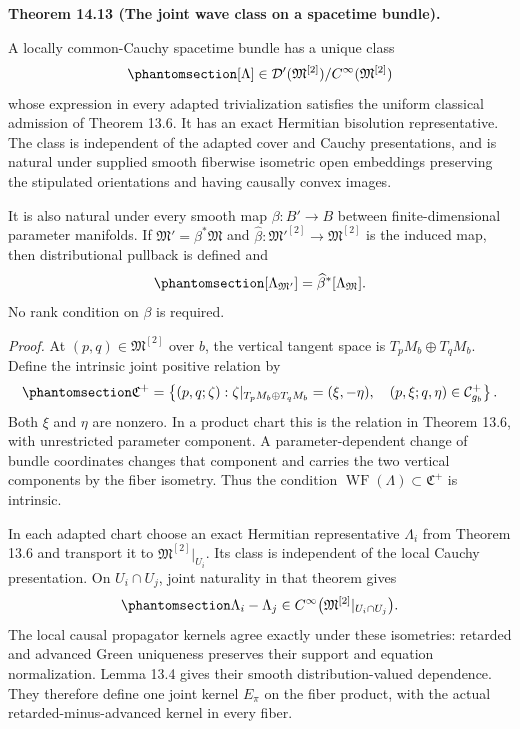 \documentclass[
  english,
  11pt,
  reqno]{amsart}
\makeatletter
\newcommand{\pandocstatementheading}[1]{%
  \par\if@nobreak\else
    \addpenalty{\@beginparpenalty}%
    \addvspace{.5\baselineskip plus .2\baselineskip minus .2\baselineskip}%
  \fi
  {\normalfont\bfseries #1\par}%
  \nobreak\@afterindenttrue\@afterheading
}
\makeatother
\begin{document}
\pandocstatementheading{\protect{}\label{thm:intrinsic-family-canonical-wave}Theorem 14.13 (The joint wave class on a spacetime bundle).}

A locally common-Cauchy spacetime bundle has a unique class
\begin{equation}\protect\phantomsection\label{eq:intrinsic-joint-wave-class}{
[\Lambda]\in\mathcal D'(\mathfrak M^{[2]})/C^\infty(\mathfrak M^{[2]})
}\end{equation} whose expression in every adapted trivialization
satisfies the uniform classical admission of Theorem 13.6. It has an
exact Hermitian bisolution representative. The class is independent of
the adapted cover and Cauchy presentations, and is natural under
supplied smooth fiberwise isometric open embeddings preserving the
stipulated orientations and having causally convex images.

It is also natural under every smooth map \(\beta:B'\to B\) between
finite-dimensional parameter manifolds. If
\(\mathfrak M'=\beta^*\mathfrak M\) and
\(\widehat\beta:\mathfrak M'^{[2]}\to\mathfrak M^{[2]}\) is the induced
map, then distributional pullback is defined and
\begin{equation}\protect\phantomsection\label{eq:intrinsic-wave-base-change}{
[\Lambda_{\mathfrak M'}]=\widehat\beta^{*}[\Lambda_{\mathfrak M}].
}\end{equation} No rank condition on \(\beta\) is required.

\emph{Proof.} At \((p,q)\in\mathfrak M^{[2]}\) over \(b\), the vertical
tangent space is \(T_pM_b\oplus T_qM_b\). Define the intrinsic joint
positive relation by
\begin{equation}\protect\phantomsection\label{eq:intrinsic-family-positive-relation}{
\mathfrak C^+
=\left\{(p,q;\zeta):
\zeta|_{T_pM_b\oplus T_qM_b}=(\xi,-\eta),\quad
(p,\xi;q,\eta)\in\mathcal C_{g_b}^+\right\}.
}\end{equation} Both \(\xi\) and \(\eta\) are nonzero. In a product
chart this is the relation in Theorem 13.6, with unrestricted parameter
component. A parameter-dependent change of bundle coordinates changes
that component and carries the two vertical components by the fiber
isometry. Thus the condition
\(\operatorname{WF}(\Lambda)\subset\mathfrak C^+\) is intrinsic.

In each adapted chart choose an exact Hermitian representative
\(\Lambda_i\) from Theorem 13.6 and transport it to
\(\mathfrak M^{[2]}|_{U_i}\). Its class is independent of the local
Cauchy presentation. On \(U_i\cap U_j\), joint naturality in that
theorem gives
\begin{equation}\protect\phantomsection\label{eq:intrinsic-local-wave-comparison}{
\Lambda_i-\Lambda_j\in
C^\infty\bigl(\mathfrak M^{[2]}|_{U_i\cap U_j}\bigr).
}\end{equation} The local causal propagator kernels agree exactly under
these isometries: retarded and advanced Green uniqueness preserves their
support and equation normalization. Lemma 13.4 gives their smooth
distribution-valued dependence. They therefore define one joint kernel
\(E_\pi\) on the fiber product, with the actual retarded-minus-advanced
kernel in every fiber.
\end{document}
